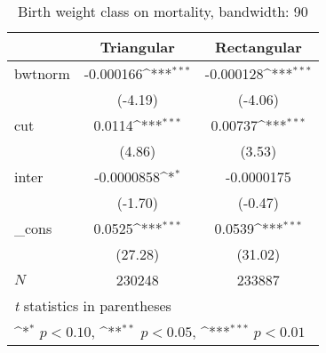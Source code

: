 \begin{table}[htbp]\centering
\def\sym#1{\ifmmode^{#1}\else\(^{#1}\)\fi}
\caption{Birth weight class on mortality, bandwidth: 90}
\begin{tabular}{l*{2}{c}}
\hline\hline
            &\multicolumn{1}{c}{Triangular}&\multicolumn{1}{c}{Rectangular}\\
\hline
bwtnorm     &   -0.000166\sym{***}&   -0.000128\sym{***}\\
            &     (-4.19)         &     (-4.06)         \\
[1em]
cut         &      0.0114\sym{***}&     0.00737\sym{***}\\
            &      (4.86)         &      (3.53)         \\
[1em]
inter       &  -0.0000858\sym{*}  &  -0.0000175         \\
            &     (-1.70)         &     (-0.47)         \\
[1em]
\_cons      &      0.0525\sym{***}&      0.0539\sym{***}\\
            &     (27.28)         &     (31.02)         \\
\hline
\(N\)       &      230248         &      233887         \\
\hline\hline
\multicolumn{3}{l}{\footnotesize \textit{t} statistics in parentheses}\\
\multicolumn{3}{l}{\footnotesize \sym{*} \(p<0.10\), \sym{**} \(p<0.05\), \sym{***} \(p<0.01\)}\\
\end{tabular}
\end{table}
